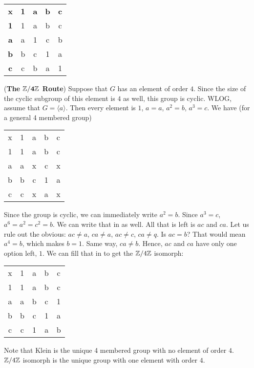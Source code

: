 \documentclass[../Main.tex]{subfiles}
\begin{document}
{\begin{center}
    \begin{tabular}{ c c c c c }
    \textbf{x} & \textbf{1} & \textbf{a} & \textbf{b} & \textbf{c} \\
    \textbf{1} & 1 & a & b & c \\
    \textbf{a} & a & 1 & c & b \\
    \textbf{b} & b & c & 1 & a \\
    \textbf{c} & c & b & a & 1 \\
    \end{tabular}
\end{center}
(\textbf{The $\mathbf{\mathbb Z/4\mathbb Z}$ Route}) Suppose that $G$ has an element of order $4$. Since the size of the cyclic subgroup of this element is $4$ as well, this group is cyclic. WLOG, assume that $G=\langle a \rangle$. Then every element is $1$, $a=a$, $a^2=b$, $a^3=c$. We have (for a general 4 membered group)

\begin{center}

    \begin{tabular}{ c c c c c }
    x & 1 & a & b & c \\
    1 & 1 & a & b & c \\
    a & a & x & c & x \\
    b & b & c & 1 & a \\
    c & c & x & a & x \\
    \end{tabular}
\end{center}

Since the group is cyclic, we can immediately write $a^2=b$. Since $a^3=c$, $a^6=a^2=c^2=b$. We can write that in as well. All that is left is $ac$ and $ca$. Let us rule out the obvious: $ac \neq a$, $ca \neq a$, $ac \neq c$, $ca \neq q$. Is $ac=b$? That would mean $a^4=b$, which makes $b=1$. Same way, $ca \neq b$. Hence, $ac$ and $ca$ have only one option left, $1$. We can fill that in to get the $\mathbb Z/ 4\mathbb Z$ isomorph:


\begin{center}

    \begin{tabular}{ c c c c c }
    x & 1 & a & b & c \\
    1 & 1 & a & b & c \\
    a & a & b & c & 1 \\
    b & b & c & 1 & a \\
    c & c & 1 & a & b \\
    \end{tabular}
\end{center} 
Note that Klein is the unique 4 membered group with no element of order $4$. $\mathbb Z/4\mathbb Z$ isomorph is the unique group with one element with order $4$. 


}
\end{document}
